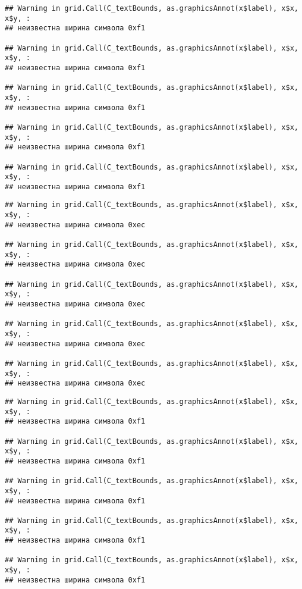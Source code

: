 \documentclass[
]{article}
\begin{document}
\begin{verbatim}
## Warning in grid.Call(C_textBounds, as.graphicsAnnot(x$label), x$x, x$y, :
## неизвестна ширина символа 0xf1

## Warning in grid.Call(C_textBounds, as.graphicsAnnot(x$label), x$x, x$y, :
## неизвестна ширина символа 0xf1

## Warning in grid.Call(C_textBounds, as.graphicsAnnot(x$label), x$x, x$y, :
## неизвестна ширина символа 0xf1

## Warning in grid.Call(C_textBounds, as.graphicsAnnot(x$label), x$x, x$y, :
## неизвестна ширина символа 0xf1

## Warning in grid.Call(C_textBounds, as.graphicsAnnot(x$label), x$x, x$y, :
## неизвестна ширина символа 0xf1
\end{verbatim}

\begin{verbatim}
## Warning in grid.Call(C_textBounds, as.graphicsAnnot(x$label), x$x, x$y, :
## неизвестна ширина символа 0xec

## Warning in grid.Call(C_textBounds, as.graphicsAnnot(x$label), x$x, x$y, :
## неизвестна ширина символа 0xec

## Warning in grid.Call(C_textBounds, as.graphicsAnnot(x$label), x$x, x$y, :
## неизвестна ширина символа 0xec

## Warning in grid.Call(C_textBounds, as.graphicsAnnot(x$label), x$x, x$y, :
## неизвестна ширина символа 0xec

## Warning in grid.Call(C_textBounds, as.graphicsAnnot(x$label), x$x, x$y, :
## неизвестна ширина символа 0xec
\end{verbatim}

\begin{verbatim}
## Warning in grid.Call(C_textBounds, as.graphicsAnnot(x$label), x$x, x$y, :
## неизвестна ширина символа 0xf1

## Warning in grid.Call(C_textBounds, as.graphicsAnnot(x$label), x$x, x$y, :
## неизвестна ширина символа 0xf1

## Warning in grid.Call(C_textBounds, as.graphicsAnnot(x$label), x$x, x$y, :
## неизвестна ширина символа 0xf1

## Warning in grid.Call(C_textBounds, as.graphicsAnnot(x$label), x$x, x$y, :
## неизвестна ширина символа 0xf1

## Warning in grid.Call(C_textBounds, as.graphicsAnnot(x$label), x$x, x$y, :
## неизвестна ширина символа 0xf1
\end{verbatim}
\end{document}
